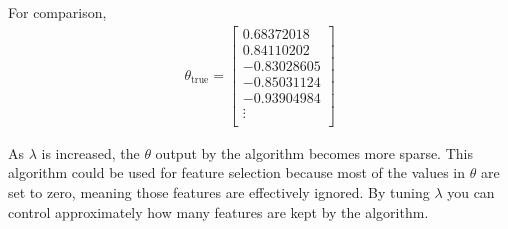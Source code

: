 \documentclass[11pt]{article}
\begin{document}
For comparison, 
\begin{align*}
    \theta_{\text{true}} = 
    \begin{bmatrix}
         0.68372018 \\
         0.84110202 \\
        -0.83028605 \\
        -0.85031124 \\
        -0.93904984 \\
        \vdots \\
    \end{bmatrix}
\end{align*}

As $\lambda$ is increased, the $\theta$ output by the algorithm becomes more sparse. This algorithm could be used for feature selection because most of the values in $\theta$ are set to zero, meaning those features are effectively ignored. By tuning $\lambda$ you can control approximately how many features are kept by the algorithm.
\end{document}

